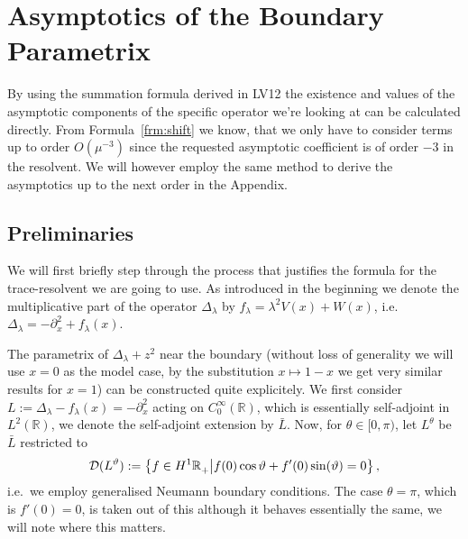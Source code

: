 \section{Asymptotics of the Boundary Parametrix}
By using the summation formula derived in LV12 the existence and values of the
asymptotic components of the specific operator we're looking at can be
calculated directly. From Formula~\eqref{frm:shift} we know, that we only have to
consider terms up to order $O(\mu^{-3})$ since the requested asymptotic
coefficient is of order $-3$ in the resolvent. We will however employ the same
method to derive the asymptotics up to the next order in the Appendix.

\subsection{Preliminaries}
We will first briefly step through the process that justifies the formula for
the trace-resolvent we are going to use. As introduced in the beginning we
denote the multiplicative part of the operator $\Delta_\lambda$ by $f_\lambda =
\lambda^2 V(x) + W(x)$, i.e.\ $\Delta_\lambda = -\partial_x^2 + f_\lambda(x)$.

The parametrix of $\Delta_\lambda + z^2$ near the boundary (without loss of
generality we will use $x = 0$ as the model case, by the substitution $x\mapsto
1-x$ we get very similar results for $x=1$) can be constructed quite
explicitely. We first consider $L := \Delta_\lambda - f_\lambda(x) =
-\partial_x^2$ acting on $C_0^\infty(\mathbb{R})$, which is essentially
self-adjoint in $L^2(\mathbb{R})$, we denote the self-adjoint extension by $\bar
L$. Now, for $\theta \in [0,\pi)$, let $L^\theta$ be $\bar L$ restricted to
\begin{align}
  \mathcal{D}(L^\vartheta) := \left\{ f\in H^1{\mathbb{R}_+^{}} \middle| f(0)\cos\vartheta +
  f'(0)\sin(\vartheta) = 0\right\},
\end{align}
i.e.\ we employ generalised Neumann boundary conditions. The case $\theta =
\pi$, which is $f'(0) = 0$, is taken out of this although it behaves essentially
the same, we will note where this matters.

